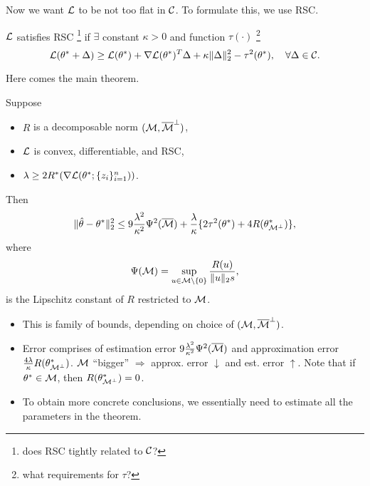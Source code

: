 Now we want $\mathcal{L}$ to be not too flat in $\mathcal{C}$.
To formulate this, we use RSC.

\begin{define}
    $\mathcal{L}$ satisfies RSC
    \footnote{does RSC tightly related to $\mathcal{C}$?}
    if $\exists$ constant $\kappa > 0$ and function $\tau(\cdot)$
    \footnote{what requirements for $\tau$?}
    \st
    \begin{equation}
        \mathcal{L}(\theta^*+\Delta)\ge \mathcal{L}(\theta^*) + \nabla \mathcal{L}(\theta^*)^T\Delta + \kappa\|\Delta\|_2^2-\tau^2(\theta^*),\quad \forall \Delta\in\mathcal{C}.
    \end{equation}
\end{define}

Here comes the main theorem.

\begin{thm}
Suppose
\begin{itemize}
    \item $R$ is a decomposable norm \wrt $(\mathcal{M}, {\overline{\mathcal{M}}}^\perp)$,
    \item $\mathcal{L}$ is convex, differentiable, and RSC,
    \item $\lambda\ge 2R^*(\nabla\mathcal{L}(\theta^*;\{z_i\}_{i=1}^n))$.
\end{itemize}
Then
\begin{equation}
    \|{\hat{\theta}}-\theta^*\|_2^2\le 9\frac{\lambda^2}{\kappa^2}\Psi^2({\overline{\mathcal{M}}})
        + \frac{\lambda}{\kappa}\{2\tau^2(\theta^*)+4R(\theta^*_{\mathcal{M}^\perp})\},
\end{equation}
where
\begin{equation}
    \Psi(\mathcal{M})=\sup_{u\in\mathcal{M}\backslash\{0\}}\frac{R(u)}{\|u\|_2s},
\end{equation}
is the Lipschitz constant of $R$ restricted to $\mathcal{M}$.
\end{thm}

\begin{rmk}\leavevmode
\begin{itemize}
    \item This is family of bounds, depending on choice of $(\mathcal{M}, {\overline{\mathcal{M}}}^\perp)$.
    \item Error comprises of estimation error $9\frac{\lambda^2}{\kappa^2}\Psi^2({\overline{\mathcal{M}}})$ and
        approximation error $\frac{4\lambda}{\kappa}R(\theta^*_{\mathcal{M}^\perp})$.
        $\mathcal{M}$ ``bigger'' $\Rightarrow$ approx. error $\downarrow$ and est. error $\uparrow$.
        Note that if $\theta^*\in\mathcal{M}$, then $R(\theta^*_{\mathcal{M}^\perp})=0$.
    \item To obtain more concrete conclusions, we essentially need to estimate
        all the parameters in the theorem.
\end{itemize}
\end{rmk}
